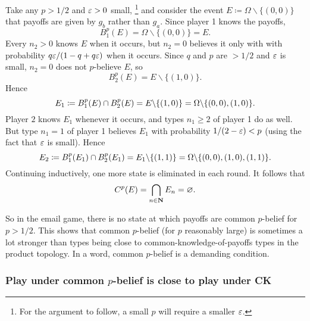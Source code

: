 \documentclass[11pt,letterpaper,reqno,oneside]{article}
\begin{document}
%
Take any $p>1/2$ and $\varepsilon>0$ small,%
	\footnote{For the argument to follow, a small $p$ will require a smaller $\varepsilon$.}
and consider the event $E \coloneqq \Omega \backslash \{ (0,0) \}$ that payoffs are given by $g_b$ rather than $g_a$. Since player 1 knows the payoffs,
%
\begin{equation*}
	B^p_1(E) = \Omega \backslash \{ (0,0) \} = E .
\end{equation*}
%
Every $n_2>0$ knows $E$ when it occurs, but $n_2=0$ believes it only with with probability $q\varepsilon/(1-q+q\varepsilon)$ when it occurs. Since $q$ and $p$ are $>1/2$ and $\varepsilon$ is small, $n_2=0$ does not $p$-believe $E$, so
%
\begin{equation*}
	B^p_2(E)
	= E \backslash \{(1,0)\} .
\end{equation*}
%
Hence
%
\begin{equation*}
	E_1 \coloneqq B^p_1(E) \cap B^p_2(E) 
	= E \backslash \{(1,0)\} 
	= \Omega \backslash \{(0,0),(1,0)\} .
\end{equation*}
%
Player $2$ knows $E_1$ whenever it occurs, and types $n_1 \geq 2$ of player 1 do as well. But type $n_1=1$ of player 1 believes $E_1$ with probability $1/(2-\varepsilon) < p$ (using the fact that $\varepsilon$ is small). Hence
%
\begin{equation*}
	E_2 \coloneqq B^p_1(E_1) \cap B^p_2(E_1) 
	= E_1 \backslash \{(1,1)\}
	= \Omega \backslash \{(0,0),(1,0),(1,1)\} .
\end{equation*}
%
Continuing inductively, one more state is eliminated in each round. It follows that
%
\begin{equation*}
	C^p(E) = \bigcap_{n \in \mathbf{N}} E_n = \varnothing .
\end{equation*}


So in the email game, there is no state at which payoffs are common $p$-belief for $p>1/2$. This shows that common $p$-belief (for $p$ reasonably large) is sometimes a lot stronger than types being close to common-knowledge-of-payoffs types in the product topology. In a word, common $p$-belief is a demanding condition.



\subsubsection{Play under common \texorpdfstring{$p$}{p}-belief is close to play under CK}
\label{sec:robustness:common_p-belief:close_to_CK}
\end{document}
